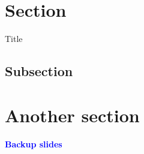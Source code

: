 \documentclass[xcolor=dvipsnames,professionalfonts, aspectratio=169]{beamer}
\begin{document}
\graphicspath{{./fig_slides/}}

\section{Section}
\begin{frame}{Title}

\end{frame}

\subsection{Subsection}
\begin{frame}[plain]

\end{frame}

\begin{frame}[standout]

\end{frame}

\section{Another section}
\begin{frame}

\end{frame}

\appendix


\begin{frame}[standout]
  \begin{center}
    \Large \bf
    \textcolor{Blue}{Backup slides}
  \end{center}
\end{frame}
\end{document}
